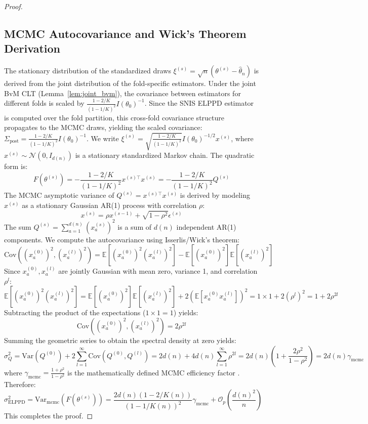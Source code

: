 \documentclass[12pt]{article}
\begin{document}
\begin{proof}
\subsection{MCMC Autocovariance and Wick's Theorem Derivation}
The stationary distribution of the standardized draws $\xi^{(s)} = \sqrt{n}(\theta^{(s)} - \hat{\theta}_n)$ is derived from the joint distribution of the fold-specific estimators. Under the joint BvM CLT (Lemma~\ref{lem:joint_bvm}), the covariance between estimators for different folds is scaled by $\frac{1 - 2/K}{(1 - 1/K)^2} I(\theta_0)^{-1}$. Since the SNIS ELPPD estimator is computed over the fold partition, this cross-fold covariance structure propagates to the MCMC draws, yielding the scaled covariance: $\Sigma_{\text{post}} = \frac{1 - 2/K}{(1 - 1/K)^2} I(\theta_0)^{-1}$.
We write $\xi^{(s)} = \sqrt{\frac{1 - 2/K}{(1 - 1/K)^2}} I(\theta_0)^{-1/2} x^{(s)}$, where $x^{(s)} \sim \mathcal{N}(0, I_{d(n)})$ is a stationary standardized Markov chain.
The quadratic form is:
\[
F(\theta^{(s)}) = -\frac{1 - 2/K}{(1 - 1/K)^2} x^{(s)\top} x^{(s)} = -\frac{1 - 2/K}{(1 - 1/K)^2} Q^{(s)}
\]
The MCMC asymptotic variance of $Q^{(s)} = x^{(s)\top} x^{(s)}$ is derived by modeling $x^{(s)}$ as a stationary Gaussian AR(1) process with correlation $\rho$:
\[
x^{(s)} = \rho x^{(s-1)} + \sqrt{1 - \rho^2} \epsilon^{(s)}
\]
The sum $Q^{(s)} = \sum_{a=1}^{d(n)} (x_a^{(s)})^2$ is a sum of $d(n)$ independent AR(1) components. We compute the autocovariance using Isserlis/Wick's theorem:
\[
\text{Cov}\left((x_a^{(0)})^2, (x_a^{(l)})^2\right) = \mathbb{E}\left[(x_a^{(0)})^2 (x_a^{(l)})^2\right] - \mathbb{E}\left[(x_a^{(0)})^2\right] \mathbb{E}\left[(x_a^{(l)})^2\right]
\]
Since $x_a^{(0)}, x_a^{(l)}$ are jointly Gaussian with mean zero, variance 1, and correlation $\rho^l$:
\[
\mathbb{E}\left[(x_a^{(0)})^2 (x_a^{(l)})^2\right] = \mathbb{E}[(x_a^{(0)})^2] \mathbb{E}[(x_a^{(l)})^2] + 2 \left( \mathbb{E}[x_a^{(0)} x_a^{(l)}] \right)^2 = 1 \times 1 + 2 (\rho^l)^2 = 1 + 2 \rho^{2l}
\]
Subtracting the product of the expectations ($1 \times 1 = 1$) yields:
\[
\text{Cov}\left((x_a^{(0)})^2, (x_a^{(l)})^2\right) = 2 \rho^{2l}
\]
Summing the geometric series to obtain the spectral density at zero yields:
\[
\sigma^2_Q = \text{Var}(Q^{(0)}) + 2 \sum_{l=1}^\infty \text{Cov}(Q^{(0)}, Q^{(l)}) = 2d(n) + 4d(n) \sum_{l=1}^\infty \rho^{2l} = 2d(n) \left( 1 + \frac{2\rho^2}{1 - \rho^2} \right) = 2 d(n) \gamma_{\mathrm{mcmc}}
\]
where $\gamma_{\mathrm{mcmc}} = \frac{1 + \rho^2}{1 - \rho^2}$ is the mathematically defined MCMC efficiency factor \cite{roberts2001geometric}.
Therefore:
\[
\sigma^2_{\mathrm{ELPPD}} = \text{Var}_{\mathrm{mcmc}}(F(\theta^{(s)})) = \frac{2 d(n) (1 - 2/K(n))}{(1 - 1/K(n))^2} \gamma_{\mathrm{mcmc}} + \mathcal{O}_p\left( \frac{d(n)^2}{n} \right)
\]
This completes the proof.
\end{proof}
\end{document}
